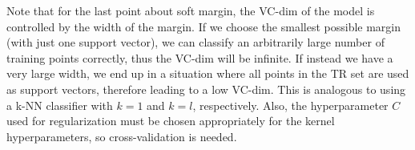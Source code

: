 Note that for the last point about soft margin, the VC-dim of the model is controlled by the width of the margin. If we choose the smallest possible margin (with just one support vector), we can classify an arbitrarily large number of training points correctly, thus the VC-dim will be infinite. If instead we have a very large width, we end up in a situation where all points in the TR set are used as support vectors, therefore leading to a low VC-dim. This is analogous to using a k-NN classifier with $k=1$ and $k=l$, respectively. Also, the hyperparameter $C$ used for regularization must be chosen appropriately for the kernel hyperparameters, so cross-validation is needed.
